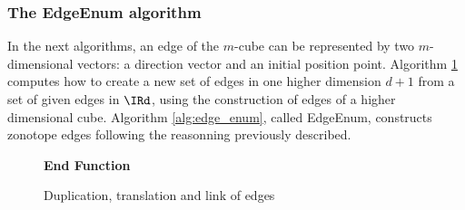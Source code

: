 \subsubsection*{The EdgeEnum algorithm}
In the next algorithms, an edge of the $m$-cube can be represented by two $m$-dimensional vectors: a direction vector and an initial position point.
Algorithm \ref{alg:cube_edge_enumeration} computes how to create a new set of edges in one higher dimension $d+1$ from a set of given edges in $\IRd$, using the construction of edges of a higher dimensional cube. Algorithm \ref{alg:edge_enum}, called EdgeEnum, constructs zonotope edges following the reasonning previously described.
\begin{figure}[!ht]
    \centering
    \begin{minipage}{1.0\linewidth}
        \begin{algorithm}[H]
            \SetAlgoLined
            
            \textbf{End Function}
            \caption{Duplication, translation and link of edges}
            \label{alg:cube_edge_enumeration}
        \end{algorithm}
    \end{minipage}
\end{figure}
